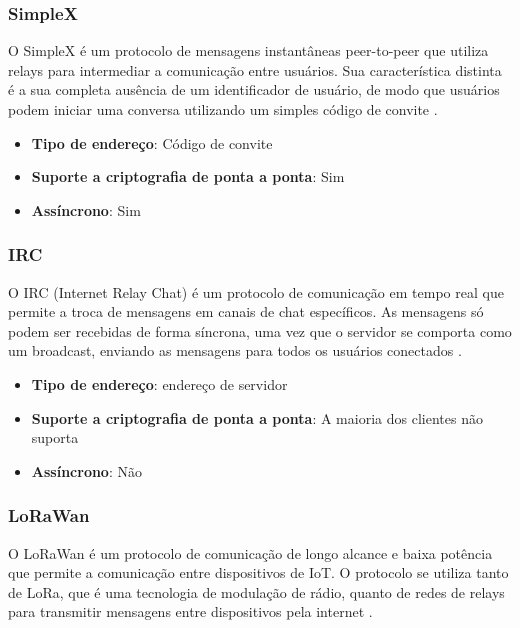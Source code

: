 \subsubsection{SimpleX}

O SimpleX é um protocolo de mensagens instantâneas peer-to-peer que utiliza relays para intermediar a comunicação entre usuários. Sua característica distinta é a sua completa ausência de um identificador de usuário, de modo que usuários podem iniciar uma conversa utilizando um simples código de convite \cite{simplex}.

\begin{itemize}
  \item \textbf{Tipo de endereço}: Código de convite
  \item \textbf{Suporte a criptografia de ponta a ponta}: Sim
  \item \textbf{Assíncrono}: Sim
\end{itemize}

\subsubsection{IRC}

O IRC (Internet Relay Chat) é um protocolo de comunicação em tempo real que permite a troca de mensagens em canais de chat específicos. As mensagens só podem ser recebidas de forma síncrona, uma vez que o servidor se comporta como um broadcast, enviando as mensagens para todos os usuários conectados \cite{rfc2810}.

\begin{itemize}
  \item \textbf{Tipo de endereço}: endereço de servidor
  \item \textbf{Suporte a criptografia de ponta a ponta}: A maioria dos clientes não suporta
  \item \textbf{Assíncrono}: Não
\end{itemize}

\subsubsection{LoRaWan}

O LoRaWan é um protocolo de comunicação de longo alcance e baixa potência que permite a comunicação entre dispositivos de IoT. O protocolo se utiliza tanto de LoRa, que é uma tecnologia de modulação de rádio, quanto de redes de relays para transmitir mensagens entre dispositivos pela internet \cite{lorawan}.

